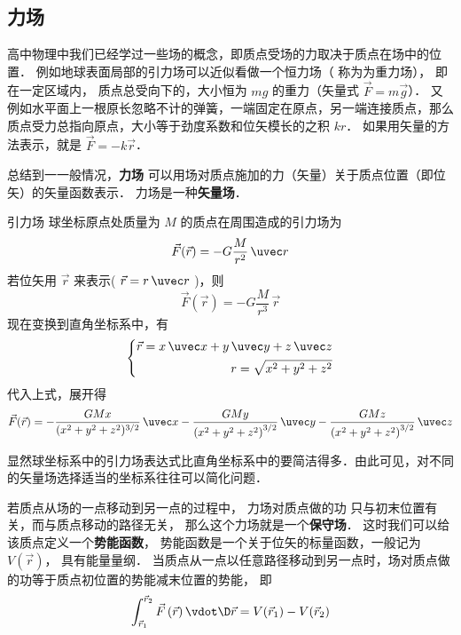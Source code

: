 
\subsection{力场}
高中物理中我们已经学过一些场的概念，即质点受场的力取决于质点在场中的位置． 例如地球表面局部的引力场可以近似看做一个恒力场（ 称为为重力场）， 即在一定区域内， 质点总受向下的，大小恒为 $mg$ 的重力（矢量式 $\vec F = m\vec g$）． 又例如水平面上一根原长忽略不计的弹簧，一端固定在原点，另一端连接质点，那么质点受力总指向原点，大小等于劲度系数和位矢模长的之积 $kr$． 如果用矢量的方法表示，就是 $\vec F = -k\vec r$．

总结到一一般情况，\textbf{力场} 可以用场对质点施加的力（矢量）关于质点位置（即位矢）的矢量函数表示． 力场是一种\textbf{矢量场}．


\begin{exam}{引力场}\label{V_ex1}
球坐标原点处质量为 $M$ 的质点在周围造成的引力场为
\begin{equation}
\vec F(\vec r) =  - G\frac{M}{{{r^2}}}\,\uvec r
\end{equation} 
若位矢用 $\vec r$ 来表示( $\vec r = r\,\uvec r$ )，则
\begin{equation}
\vec F(\vec r) =  - G\frac{M}{{{r^3}}}\,\vec r
\end{equation}
现在变换到直角坐标系中，有
\begin{equation}
\left\{ \begin{aligned}
\vec r = x\,\uvec x + y\,\uvec y + z\,\uvec z\\
r = \sqrt {{x^2} + {y^2} + {z^2}} 
\end{aligned} \right.
\end{equation} 
代入上式，展开得
\begin{equation}
\vec F(\vec r) =  - \frac{GMx}{(x^2+y^2+z^2)^{3/2}}\,\uvec x - \frac{GMy}{{(x^2 +y^2+z^2)}^{3/2}}\,\uvec y - \frac{GMz}{{(x^2+y^2+z^2)}^{3/2}}\,\uvec z 
\end{equation} 

显然球坐标系中的引力场表达式比直角坐标系中的要简洁得多．由此可见，对不同的矢量场选择适当的坐标系往往可以简化问题．
\end{exam}

若质点从场的一点移动到另一点的过程中， 力场对质点做的功 只与初末位置有关，而与质点移动的路径无关， 那么这个力场就是一个\textbf{保守场}． 这时我们可以给该质点定义一个\textbf{势能函数}， 势能函数是一个关于位矢的标量函数，一般记为 $V(\vec r)$， 具有能量量纲． 当质点从一点以任意路径移动到另一点时，场对质点做的功等于质点初位置的势能减末位置的势能， 即
\begin{equation}\label{V_eq1}
\int_{\vec r_1}^{\vec r_2} \vec F\left( {\vec r} \right) \vdot \D \vec r = V(\vec r_1)-V(\vec r_2)
\end{equation}

